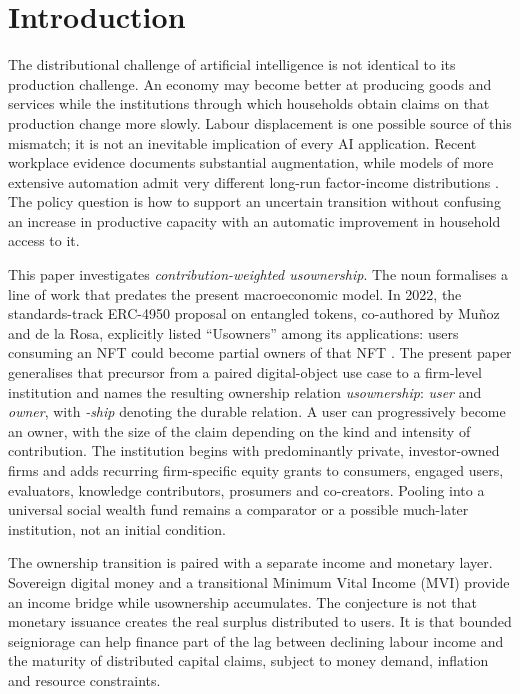 \section{Introduction}
The distributional challenge of artificial intelligence is not identical to its production challenge. An economy may become better at producing goods and services while the institutions through which households obtain claims on that production change more slowly. Labour displacement is one possible source of this mismatch; it is not an inevitable implication of every AI application. Recent workplace evidence documents substantial augmentation, while models of more extensive automation admit very different long-run factor-income distributions \citep{brynjolfsson2025,acemoglu2018,trammell2026}. The policy question is how to support an uncertain transition without confusing an increase in productive capacity with an automatic improvement in household access to it.

This paper investigates \emph{contribution-weighted usownership}. The noun formalises a line of work that predates the present macroeconomic model. In 2022, the standards-track ERC-4950 proposal on entangled tokens, co-authored by Mu\~noz and de la Rosa, explicitly listed ``Usowners'' among its applications: users consuming an NFT could become partial owners of that NFT \citep{erc4950}. The present paper generalises that precursor from a paired digital-object use case to a firm-level institution and names the resulting ownership relation \emph{usownership}: \emph{user} and \emph{owner}, with \emph{-ship} denoting the durable relation. A user can progressively become an owner, with the size of the claim depending on the kind and intensity of contribution. The institution begins with predominantly private, investor-owned firms and adds recurring firm-specific equity grants to consumers, engaged users, evaluators, knowledge contributors, prosumers and co-creators. Pooling into a universal social wealth fund remains a comparator or a possible much-later institution, not an initial condition.

The ownership transition is paired with a separate income and monetary layer. Sovereign digital money and a transitional Minimum Vital Income (MVI) provide an income bridge while usownership accumulates. The conjecture is not that monetary issuance creates the real surplus distributed to users. It is that bounded seigniorage can help finance part of the lag between declining labour income and the maturity of distributed capital claims, subject to money demand, inflation and resource constraints.

